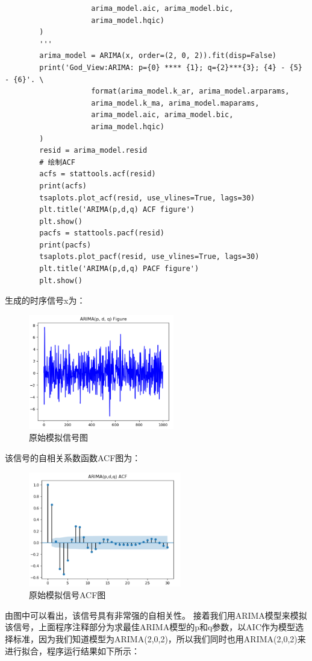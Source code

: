 \documentclass{article}
\begin{document}
\begin{lstlisting}
                    arima_model.aic, arima_model.bic, 
                    arima_model.hqic)
        )
        '''
        arima_model = ARIMA(x, order=(2, 0, 2)).fit(disp=False)
        print('God_View:ARIMA: p={0} **** {1}; q={2}***{3}; {4} - {5} - {6}'. \
                    format(arima_model.k_ar, arima_model.arparams, 
                    arima_model.k_ma, arima_model.maparams, 
                    arima_model.aic, arima_model.bic, 
                    arima_model.hqic)
        )
        resid = arima_model.resid
        # 绘制ACF
        acfs = stattools.acf(resid)
        print(acfs)
        tsaplots.plot_acf(resid, use_vlines=True, lags=30)
        plt.title('ARIMA(p,d,q) ACF figure')
        plt.show()
        pacfs = stattools.pacf(resid)
        print(pacfs)
        tsaplots.plot_pacf(resid, use_vlines=True, lags=30)
        plt.title('ARIMA(p,d,q) PACF figure')
        plt.show()
\end{lstlisting}
生成的时序信号x为：
\begin{figure}[H]
	\caption{原始模拟信号图}
	\label{f000017}
	\centering
	\includegraphics[height=5cm]{images/f000017}
\end{figure}
该信号的自相关系数函数ACF图为：
\begin{figure}[H]
	\caption{原始模拟信号ACF图}
	\label{f000018}
	\centering
	\includegraphics[height=5cm]{images/f000018}
\end{figure}
由图中可以看出，该信号具有非常强的自相关性。\newline
接着我们用ARIMA模型来模拟该信号，上面程序注释部分为求最佳ARIMA模型的p和q参数，以AIC作为模型选择标准，因为我们知道模型为ARIMA(2,0,2)，所以我们同时也用ARIMA(2,0,2)来进行拟合，程序运行结果如下所示：
\end{document}
